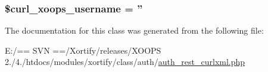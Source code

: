 \hypertarget{class_xortify_auth_rest___curlxml_aab7480ba9f878a02b2c9fd43922fa070}{
\subsubsection[{\$curl\-\_\-xoops\-\_\-username}]{\setlength{\rightskip}{0pt plus 5cm}\$curl\-\_\-xoops\-\_\-username = ''}}\label{class_xortify_auth_rest___curlxml_aab7480ba9f878a02b2c9fd43922fa070}


The documentation for this class was generated from the following file\-:\begin{DoxyCompactItemize}
\item 
E\-:/== S\-V\-N ==/\-Xortify/releases/\-X\-O\-O\-P\-S 2./4./htdocs/modules/xortify/class/auth/\hyperlink{auth__rest__curlxml_8php}{auth\-\_\-rest\-\_\-curlxml.\-php}\end{DoxyCompactItemize}
